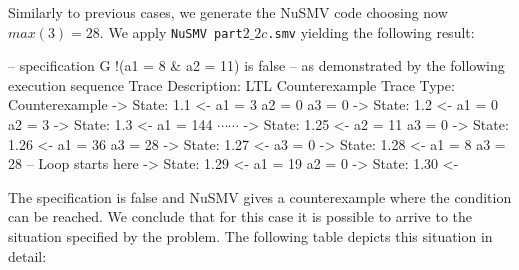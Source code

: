 \begin{description}
  Similarly to previous cases, we generate the NuSMV code choosing now $max(3)=28$. We apply {\tt NuSMV part$2\_2c$.smv} yielding the following result:

      \vspace{2mm}
\selectfont
{\footnotesize
\noindent
-- specification  G !(a1 = 8 \& a2 = 11)  is false\newline
-- as demonstrated by the following execution sequence\newline
Trace Description: LTL Counterexample\newline
Trace Type: Counterexample\newline
  -> State: 1.1 <-\newline
    a1 = 3\newline
    a2 = 0\newline
    a3 = 0\newline
  -> State: 1.2 <-\newline
    a1 = 0\newline
    a2 = 3\newline
  -> State: 1.3 <-\newline
    a1 = 144\newline
  $\cdots \cdots$
  \newline
  -> State: 1.25 <-\newline
    a2 = 11\newline
    a3 = 0\newline
  -> State: 1.26 <-\newline
    a1 = 36\newline
    a3 = 28\newline
  -> State: 1.27 <-\newline
    a3 = 0\newline
  -> State: 1.28 <-\newline
    a1 = 8\newline
    a3 = 28\newline
  -- Loop starts here\newline
  -> State: 1.29 <-\newline
    a1 = 19\newline
    a2 = 0\newline
  -> State: 1.30 <-\newline
}
\selectfont
\end{description}
The specification is false and NuSMV gives a counterexample where the condition can be reached. We conclude that for this case it is possible to arrive to the situation specified by the problem. The following table depicts this situation in detail:

